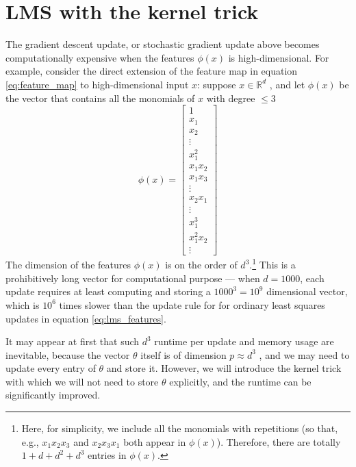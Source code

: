 \section{LMS with the kernel trick}
The gradient descent update, or stochastic gradient update above becomes
computationally expensive when the features $\phi(x)$ is high-dimensional. For
example, consider the direct extension of the feature map in equation \ref{eq:feature_map} to
high-dimensional input $x$: suppose $x \in \mathbb{R}^d$ , and let $\phi(x)$ be the vector that
contains all the monomials of $x$ with degree $\le 3$
\begin{equation}
    \phi(x) = \begin{bmatrix}
        1\\
        x_1\\
        x_2\\
        \vdots\\
        x_1^2\\
        x_1x_2\\
        x_1x_3\\
        \vdots\\
        x_2x_1\\
        \vdots\\
        x_1^3\\
        x_1^2x_2\\
        \vdots
    \end{bmatrix}\label{eq:high_dim_feature_map}
\end{equation}
The dimension of the features $\phi(x)$ is on the order of $d^3$.\footnote{
Here, for simplicity, we include all the monomials with repetitions (so that, e.g., $x_1 x_2 x_3$
and $x_2 x_3 x_1$ both appear in $\phi(x)$). Therefore, there are totally $1 + d + d^2 + d^3$ entries in
$\phi(x)$.}
This is a prohibitively long vector for computational purpose --- when $d = 1000$, each
update requires at least computing and storing a $1000^3 = 10^9$ dimensional
vector, which is $10^6$ times slower than the update rule for for ordinary least
squares updates in equation \ref{eq:lms_features}. %

It may appear at first that such $d^3$ runtime per update and memory usage
are inevitable, because the vector $\theta$ itself is of dimension $p \approx d^3$ , and we may
need to update every entry of $\theta$ and store it. However, we will introduce the
kernel trick with which we will not need to store $\theta$ explicitly, and the runtime
can be significantly improved.

